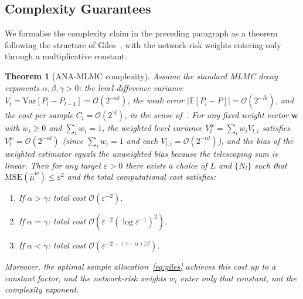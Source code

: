 \documentclass[pdflatex,sn-mathphys-num]{sn-jnl}
\theoremstyle{thmstyleone}%
\newtheorem{theorem}{Theorem}%
\theoremstyle{thmstyletwo}%
\theoremstyle{thmstylethree}%
\begin{document}
\subsection{Complexity Guarantees}
\label{subsec:complexity}

We formalise the complexity claim in the preceding paragraph as a theorem following the
structure of Giles~\cite{giles2015multilevel}, with the network-risk weights entering only
through a multiplicative constant.

\begin{theorem}[ANA-MLMC complexity]
\label{thm:complexity}
Assume the standard MLMC decay exponents $\alpha, \beta, \gamma > 0$: the level-difference
variance $V_l = \mathrm{Var}[P_l - P_{l-1}] = \mathcal{O}(2^{-\alpha l})$, the weak error
$|\mathbb{E}[P_l - P]| = \mathcal{O}(2^{-\beta l})$, and the cost per sample
$C_l = \mathcal{O}(2^{\gamma l})$, in the sense of~\cite{giles2015multilevel}.
For any fixed weight vector $\mathbf{w}$ with $w_i \ge 0$ and $\sum_i w_i = 1$,
the weighted level variance $V_l^w = \sum_i w_i V_{l,i}$ satisfies
$V_l^w = \mathcal{O}(2^{-\alpha l})$ (since $\sum_i w_i = 1$ and each $V_{l,i} = \mathcal{O}(2^{-\alpha l})$), and the bias
of the weighted estimator equals the unweighted bias because the telescoping sum
is linear.  Then for any target $\varepsilon > 0$ there exists a choice of $L$ and
$\{N_l\}$ such that $\mathrm{MSE}(\hat{\mu}^w) \le \varepsilon^2$ and the total
computational cost satisfies:
\begin{enumerate}
  \item[{\rm (i)}] If $\alpha > \gamma$: total cost $\mathcal{O}(\varepsilon^{-2})$.
  \item[{\rm (ii)}] If $\alpha = \gamma$: total cost
    $\mathcal{O}\!\left(\varepsilon^{-2}(\log\varepsilon^{-1})^2\right)$.
  \item[{\rm (iii)}] If $\alpha < \gamma$: total cost
    $\mathcal{O}\!\left(\varepsilon^{-2-(\gamma-\alpha)/\beta}\right)$.
\end{enumerate}
Moreover, the optimal sample allocation~\eqref{eq:giles} achieves this cost up to a
constant factor, and the network-risk weights $w_i$ enter only that constant, not the
complexity exponent.
\end{theorem}
\end{document}
